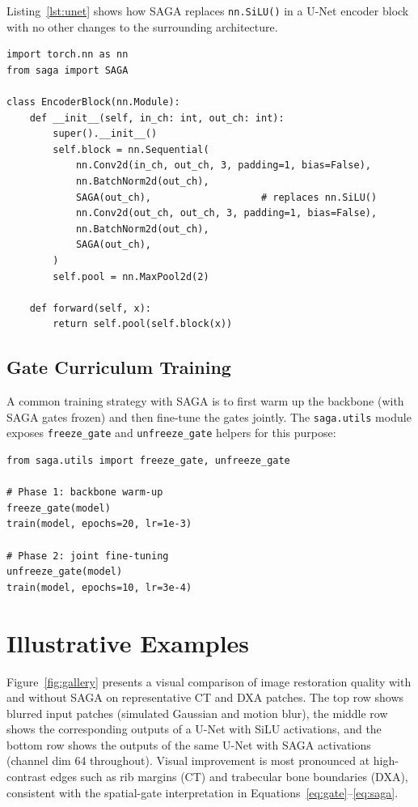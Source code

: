 \documentclass[preprint,12pt]{elsarticle}
\begin{document}
Listing~\ref{lst:unet} shows how SAGA replaces \texttt{nn.SiLU()} in a
U-Net encoder block with no other changes to the surrounding architecture.

\begin{lstlisting}[caption={Integrating SAGA into a U-Net encoder block.},
                   label={lst:unet}]
import torch.nn as nn
from saga import SAGA

class EncoderBlock(nn.Module):
    def __init__(self, in_ch: int, out_ch: int):
        super().__init__()
        self.block = nn.Sequential(
            nn.Conv2d(in_ch, out_ch, 3, padding=1, bias=False),
            nn.BatchNorm2d(out_ch),
            SAGA(out_ch),                   # replaces nn.SiLU()
            nn.Conv2d(out_ch, out_ch, 3, padding=1, bias=False),
            nn.BatchNorm2d(out_ch),
            SAGA(out_ch),
        )
        self.pool = nn.MaxPool2d(2)

    def forward(self, x):
        return self.pool(self.block(x))
\end{lstlisting}

\subsection{Gate Curriculum Training}

A common training strategy with SAGA is to first warm up the backbone
(with SAGA gates frozen) and then fine-tune the gates jointly.
The \texttt{saga.utils} module exposes \texttt{freeze\_gate} and
\texttt{unfreeze\_gate} helpers for this purpose:

\begin{lstlisting}[caption={Curriculum training with gate freezing.},
                   label={lst:curriculum}]
from saga.utils import freeze_gate, unfreeze_gate

# Phase 1: backbone warm-up
freeze_gate(model)
train(model, epochs=20, lr=1e-3)

# Phase 2: joint fine-tuning
unfreeze_gate(model)
train(model, epochs=10, lr=3e-4)
\end{lstlisting}

\section{Illustrative Examples}
\label{sec:examples}

Figure~\ref{fig:gallery} presents a visual comparison of image restoration
quality with and without SAGA on representative CT and DXA patches.
The top row shows blurred input patches (simulated Gaussian and motion blur),
the middle row shows the corresponding outputs of a U-Net with SiLU activations,
and the bottom row shows the outputs of the same U-Net with SAGA activations
(channel dim 64 throughout).
Visual improvement is most pronounced at high-contrast edges such as rib margins
(CT) and trabecular bone boundaries (DXA), consistent with the spatial-gate
interpretation in Equations~\eqref{eq:gate}--\eqref{eq:saga}.
\end{document}
